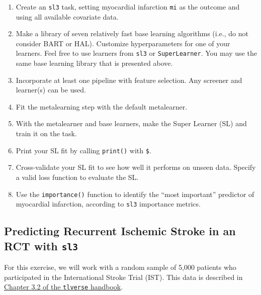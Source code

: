 \documentclass[12pt, krantz2,]{krantz}
\newcommand{\passthrough}[1]{#1}
\providecommand{\tightlist}{%
  \setlength{\itemsep}{0pt}\setlength{\parskip}{0pt}}
\theoremstyle{definition}
\theoremstyle{definition}
\theoremstyle{definition}
\newcommand{\1}{\mathbbm{1}}
\begin{document}
\begin{enumerate}
\def\labelenumi{\arabic{enumi}.}
\tightlist
\item
  Create an \passthrough{\lstinline!sl3!} task, setting myocardial infarction \passthrough{\lstinline!mi!} as the outcome and
  using all available covariate data.
\item
  Make a library of seven relatively fast base learning algorithms (i.e., do
  not consider BART or HAL). Customize hyperparameters for one of your
  learners. Feel free to use learners from \passthrough{\lstinline!sl3!} or \passthrough{\lstinline!SuperLearner!}. You may
  use the same base learning library that is presented above.
\item
  Incorporate at least one pipeline with feature selection. Any screener and
  learner(s) can be used.
\item
  Fit the metalearning step with the default metalearner.
\item
  With the metalearner and base learners, make the Super Learner (SL) and
  train it on the task.
\item
  Print your SL fit by calling \passthrough{\lstinline!print()!} with \passthrough{\lstinline!$!}.
\item
  Cross-validate your SL fit to see how well it performs on unseen
  data. Specify a valid loss function to evaluate the SL.
\item
  Use the \passthrough{\lstinline!importance()!} function to identify the ``most important'' predictor of
  myocardial infarction, according to \passthrough{\lstinline!sl3!} importance metrics.
\end{enumerate}

\hypertarget{sl3ex2}{%
\subsection{\texorpdfstring{Predicting Recurrent Ischemic Stroke in an RCT with \texttt{sl3}}{Predicting Recurrent Ischemic Stroke in an RCT with sl3}}\label{sl3ex2}}

For this exercise, we will work with a random sample of 5,000 patients who
participated in the International Stroke Trial (IST). This data is described in
\href{https://tlverse.org/tlverse-handbook/data.html\#ist}{Chapter 3.2 of the \passthrough{\lstinline!tlverse!}
handbook}.
\end{document}
